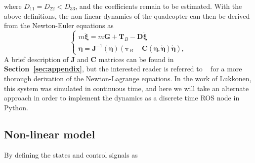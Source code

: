\documentclass{article}
\begin{document}
where $D_{11}=D_{22} < D_{33}$, and the coefficients remain to be estimated. With the above definitions, the non-linear dynamics of the quadcopter can then be derived from the Newton-Euler equations as
\begin{equation}
\begin{cases}
 m\ddot{\boldsymbol{\xi}} = m\mathbf{G} + \mathbf{T}_{B}-\mathbf{D}\dot{\boldsymbol{\xi}}\\
\ddot{\boldsymbol{\eta}}=\mathbf{J}^{-1}(\boldsymbol{\eta})(\boldsymbol{\tau}_B-\mathbf{C}(\boldsymbol{\eta},\dot{\boldsymbol{\eta}})\dot{\boldsymbol{\eta}}),
\end{cases}
\end{equation}
A brief description of $\mathbf{J}$ and $\mathbf{C}$ matrices can be found in \textbf{Section~\ref{sec:appendix}}, but the interested reader is referred to ~\cite{luukkonen2011modelling} for a more thorough derivation of the Newton-Lagrange equations. In the work of Lukkonen, this system was simulated in continuous time, and here we will take an alternate approach in order to implement the dynamics as a discrete time ROS node in Python.

\subsection{Non-linear model}
By defining the states and control signals as
\end{document}
